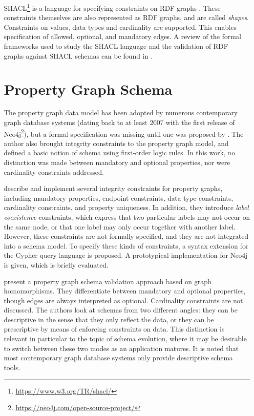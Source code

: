 \documentclass{report}
\theoremstyle{definition}
\begin{document}
SHACL\footnote{\url{https://www.w3.org/TR/shacl/}} is a language for specifying constraints on RDF graphs \citep{pan2009rdf}. These constraints themselves are also represented as RDF graphs, and are called \emph{shapes}. Constraints on values, data types and cardinality are supported. This enables specification of allowed, optional, and mandatory edges. A review of the formal frameworks used to study the SHACL language and the validation of RDF graphs against SHACL schemas can be found in \citet{pareti2022shacl}.

\section{Property Graph Schema}

The property graph data model has been adopted by numerous contemporary graph database systems (dating back to at least 2007 with the first release of Neo4j\footnote{\url{https://neo4j.com/open-source-project/}}), but a formal specification was missing until one was proposed by \citet{angles2018property}. The author also brought integrity constraints to the property graph model, and defined a basic notion of schema using first-order logic rules. In this work, no distinction was made between mandatory and optional properties, nor were cardinality constraints addressed.

\citet{pokorny2017integrity} describe and implement several integrity constraints for property graphs, including mandatory properties, endpoint constraints, data type constraints, cardinality constraints, and property uniqueness. In addition, they introduce \emph{label coexistence} constraints, which express that two particular labels may not occur on the same node, or that one label may only occur together with another label. However, these constraints are not formally specified, and they are not integrated into a schema model. To specify these kinds of constraints, a syntax extension for the Cypher query language \citep{francis2018cypher} is proposed. A prototypical implementation for Neo4j is given, which is briefly evaluated.

\citet{bonifati2019schema} present a property graph schema validation approach based on graph homomorphisms. They differentiate between mandatory and optional properties, though edges are always interpreted as optional. Cardinality constraints are not discussed. The authors look at schemas from two different angles: they can be descriptive in the sense that they only reflect the data, or they can be prescriptive by means of enforcing constraints on data. This distinction is relevant in particular to the topic of schema evolution, where it may be desirable to switch between these two modes as an application matures. It is noted that most contemporary graph database systems only provide descriptive schema tools.
\end{document}
